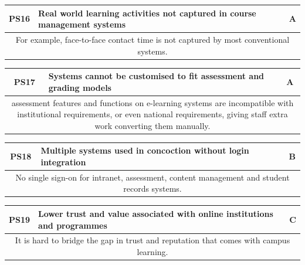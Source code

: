 \begin{table}[!ht]
	\begin{tabularx}{\textwidth}{|c|X|c|}
		\hline
		PS16 & \textbf{Real world learning activities not captured in course management systems} & A               \\
		\hline
		\multicolumn{3}{|X|}{For example, face-to-face contact time is not captured by most conventional systems.} \\
		\hline
	\end{tabularx}
\end{table}

\begin{table}[!ht]
	\begin{tabularx}{\textwidth}{|c|X|c|}
		\hline
		PS17 & \textbf{Systems cannot be customised to fit assessment and grading models} & A                              \\
		\hline
		\multicolumn{3}{|X|}{assessment features and functions on e-learning systems are incompatible
			with institutional requirements, or even national requirements, giving staff extra work converting them manually.} \\
		\hline
	\end{tabularx}
\end{table}

\begin{table}[!ht]
	\begin{tabularx}{\textwidth}{|c|X|c|}
		\hline
		PS18 & \textbf{Multiple systems used in concoction without login integration} & B                                 \\
		\hline
		\multicolumn{3}{|X|}{No single sign-on for intranet, assessment, content management and student records systems.} \\
		\hline
	\end{tabularx}
\end{table}

\begin{table}[!ht]
	\begin{tabularx}{\textwidth}{|c|X|c|}
		\hline
		PS19 & \textbf{Lower trust and value associated with online institutions and programmes} & C                \\
		\hline
		\multicolumn{3}{|X|}{It is hard to bridge the gap in trust and reputation that comes with campus learning.} \\
		\hline
	\end{tabularx}
\end{table}

